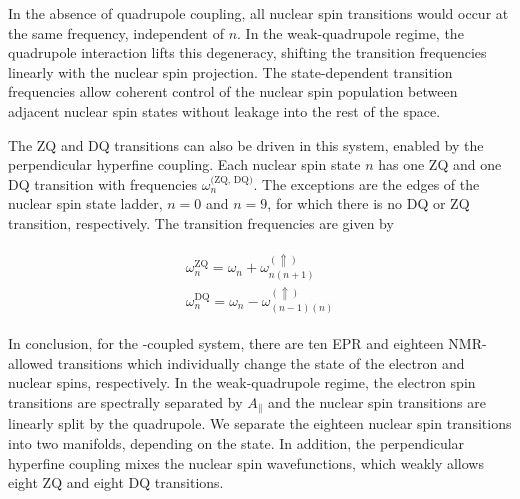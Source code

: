 In the absence of quadrupole coupling, all nuclear spin transitions would occur at the same frequency, independent of 
$n$. In the weak-quadrupole regime, the quadrupole interaction lifts this degeneracy, shifting the transition frequencies linearly with the nuclear spin projection. The state-dependent transition frequencies allow coherent control of the nuclear spin population between adjacent nuclear spin states without leakage into the rest of the space.

The ZQ and DQ transitions can also be driven in this system, enabled by the perpendicular hyperfine coupling. Each nuclear spin state $n$ has one ZQ and one DQ transition with frequencies $\omega_n^\text{(ZQ, DQ)}$. The exceptions are the edges of the nuclear spin state ladder, $n=0$ and $n=9$, for which there is no DQ or ZQ transition, respectively. The transition frequencies are given by

\begin{align}
\begin{split}
    \omega_{n}^\text{ZQ} = \omega_n + \omega_{n(n+1)}^{(\Uparrow)}  \\
    \omega_{n}^\text{DQ} = \omega_n - \omega_{(n-1)(n)}^{(\Uparrow)}
\end{split}
\end{align}

In conclusion, for the \Nb-\Er coupled system, there are ten EPR and eighteen NMR-allowed transitions which individually change the state of the electron and nuclear spins, respectively. In the weak-quadrupole regime, the electron spin transitions are spectrally separated by $A_\parallel$ and the nuclear spin transitions are linearly split by the quadrupole. We separate the eighteen nuclear spin transitions into two manifolds, depending on the \Er state. In addition, the perpendicular hyperfine coupling mixes the nuclear spin wavefunctions, which weakly allows eight ZQ and eight DQ transitions.